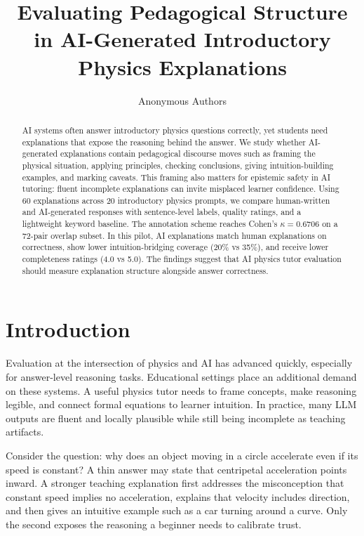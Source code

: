 \documentclass{article}
\title{Evaluating Pedagogical Structure in AI-Generated Introductory Physics Explanations}
\author{Anonymous Authors}
\begin{document}
\maketitle

\begin{abstract}
AI systems often answer introductory physics questions correctly, yet students need explanations that expose the reasoning behind the answer. We study whether AI-generated explanations contain pedagogical discourse moves such as framing the physical situation, applying principles, checking conclusions, giving intuition-building examples, and marking caveats. This framing also matters for epistemic safety in AI tutoring: fluent incomplete explanations can invite misplaced learner confidence. Using 60 explanations across 20 introductory physics prompts, we compare human-written and AI-generated responses with sentence-level labels, quality ratings, and a lightweight keyword baseline. The annotation scheme reaches Cohen's $\kappa=0.6706$ on a 72-pair overlap subset. In this pilot, AI explanations match human explanations on correctness, show lower intuition-bridging coverage (20\% vs 35\%), and receive lower completeness ratings (4.0 vs 5.0). The findings suggest that AI physics tutor evaluation should measure explanation structure alongside answer correctness.
\end{abstract}

\section{Introduction}
Evaluation at the intersection of physics and AI has advanced quickly, especially for answer-level reasoning tasks. Educational settings place an additional demand on these systems. A useful physics tutor needs to frame concepts, make reasoning legible, and connect formal equations to learner intuition. In practice, many LLM outputs are fluent and locally plausible while still being incomplete as teaching artifacts.

Consider the question: why does an object moving in a circle accelerate even if its speed is constant? A thin answer may state that centripetal acceleration points inward. A stronger teaching explanation first addresses the misconception that constant speed implies no acceleration, explains that velocity includes direction, and then gives an intuitive example such as a car turning around a curve. Only the second exposes the reasoning a beginner needs to calibrate trust.
\end{document}
